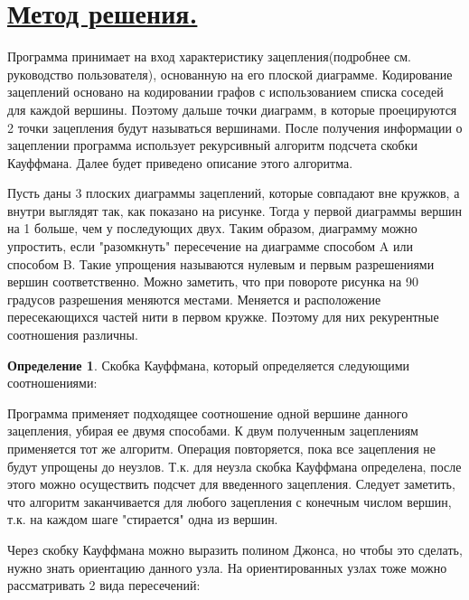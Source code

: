 \documentclass{article}
\theoremstyle{theorem}
\theoremstyle{definition}
\newtheorem{defi}[theo]{Определение}
\begin{document}
\section{\underline{Метод решения.}}

{Программа принимает на вход характеристику зацепления(подробнее см. руководство пользователя), основанную на его плоской диаграмме. Кодирование зацеплений основано на кодировании графов с использованием списка соседей для каждой вершины. Поэтому дальше точки диаграмм, в которые проецируются 2 точки зацепления будут называться вершинами. После получения информации о зацеплении программа использует рекурсивный алгоритм подсчета скобки Кауффмана. Далее будет приведено описание этого алгоритма.

Пусть даны 3 плоских диаграммы зацеплений, которые совпадают вне кружков, а внутри выглядят так, как показано на рисунке. Тогда у первой диаграммы вершин на 1 больше, чем у последующих двух. Таким образом, диаграмму можно упростить, если "разомкнуть" пересечение на диаграмме способом A или способом B. Такие упрощения называются нулевым и первым разрешениями вершин соответственно. Можно заметить, что при повороте рисунка на 90 градусов разрешения меняются местами. Меняется и расположение пересекающихся частей нити в первом кружке. Поэтому для них рекурентные соотношения различны.}
\begin{defi}
Скобка Кауффмана, который определяется следующими соотношениями:
\end{defi}
{Программа применяет подходящее соотношение одной вершине данного зацепления, убирая ее двумя способами. К двум полученным зацеплениям применяется тот же алгоритм. Операция повторяется, пока все зацепления не будут упрощены до неузлов. Т.к. для неузла скобка Кауффмана определена, после этого можно осуществить подсчет для введенного зацепления. Следует заметить, что алгоритм заканчивается для любого зацепления с конечным числом вершин, т.к. на каждом шаге "стирается" одна из вершин.}

{Через скобку Кауффмана можно выразить полином Джонса, но чтобы это сделать, нужно знать ориентацию данного узла. На ориентированных узлах тоже можно рассматривать 2 вида пересечений:}
\end{document}
